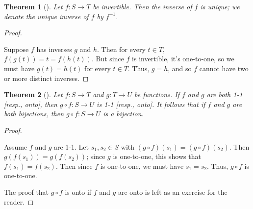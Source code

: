 \documentclass[10pt,]{book}
\theoremstyle{plain}
\newtheorem{theorem}{Theorem}[section]
\theoremstyle{definition}
\theoremstyle{definition}
\theoremstyle{definition}
\theoremstyle{definition}
\numberwithin{equation}{section}
\begin{document}
\begin{theorem}[{}]\label{theorem-2}
\label{notation-28}
 Let \(f:S\to T\) be invertible. Then the  inverse of \(f\) is unique; we denote the unique inverse of \(f\) by \(f^{-1}\).%
\end{theorem}
\begin{proof}\hypertarget{proof-2}{}
Suppose \(f\) has inverses \(g\) and \(h\). Then for every \(t\in T,\) \(f(g(t))=t=f(h(t))\). But since \(f\) is invertible, it's one-to-one, so we must have \(g(t)=h(t)\) for every \(t\in T\). Thus, \(g=h\), and so \(f\) cannot have two or more distinct inverses.%
\end{proof}
\begin{theorem}[{}]\label{compbij}
Let \(f:S\to T\) and \(g:T\to U\) be functions. If \(f\) and \(g\) are both 1-1 [resp., onto], then \(g\circ f: S\to U\) is 1-1 [resp., onto]. It follows that if \(f\) and \(g\) are both bijections, then \(g\circ f: S\to U\) is a bijection.%
\end{theorem}
\begin{proof}\hypertarget{proof-3}{}
Assume \(f\) and \(g\) are 1-1. Let \(s_1, s_2\in S\) with \((g\circ f)(s_1)=(g\circ f)(s_2)\). Then \(g(f(s_1))=g(f(s_2))\); since \(g\) is one-to-one, this shows that \(f(s_1)=f(s_2)\). Then since \(f\) is one-to-one, we must have \(s_1=s_2\). Thus, \(g\circ f\) is one-to-one.%
\par
The proof that \(g\circ f\) is onto if \(f\) and \(g\) are onto is left as an exercise for the reader.%
\end{proof}
\typeout{************************************************}
\typeout{************************************************}
\end{document}
